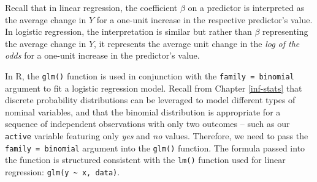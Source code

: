 \documentclass[
]{book}
\begin{document}
Recall that in linear regression, the coefficient \(\beta\) on a predictor is interpreted as the average change in \(Y\) for a one-unit increase in the respective predictor's value. In logistic regression, the interpretation is similar but rather than \(\beta\) representing the average change in \(Y\), it represents the average unit change in the \emph{log of the odds} for a one-unit increase in the predictor's value.

In R, the \texttt{glm()} function is used in conjunction with the \texttt{family\ =\ binomial} argument to fit a logistic regression model. Recall from Chapter \ref{inf-stats} that discrete probability distributions can be leveraged to model different types of nominal variables, and that the binomial distribution is appropriate for a sequence of independent observations with only two outcomes -- such as our \texttt{active} variable featuring only \emph{yes} and \emph{no} values. Therefore, we need to pass the \texttt{family\ =\ binomial} argument into the \texttt{glm()} function. The formula passed into the function is structured consistent with the \texttt{lm()} function used for linear regression: \texttt{glm(y\ \textasciitilde{}\ x,\ data)}.

\providecommand{\docline}[3]{\noalign{\global\setlength{\arrayrulewidth}{#1}}\arrayrulecolor[HTML]{#2}\cline{#3}}

\setlength{\tabcolsep}{2pt}

\renewcommand*{\arraystretch}{1.5}
\end{document}
